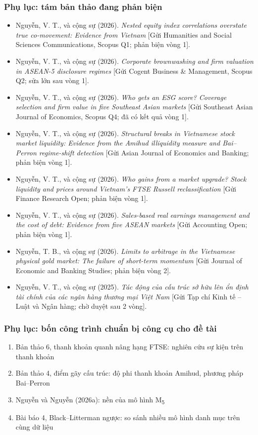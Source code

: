 \documentclass[11pt, xcolor={dvipsnames}, aspectratio=169, usepdftitle=false]{beamer}
\newcommand{\MM}[1]{M\textsubscript{#1}}
\begin{document}
\begin{frame}[allowframebreaks]
\frametitle{Phụ lục: tám bản thảo đang phản biện}
\hypertarget{banThao}{}%
\begin{itemize}
\item Nguyễn, V. T., và cộng sự (2026). \emph{Nested equity index correlations overstate true co-movement: Evidence from Vietnam} [Gửi Humanities and Social Sciences Communications, Scopus Q1; phản biện vòng 1].
\item Nguyễn, V. T., và cộng sự (2026). \emph{Corporate brownwashing and firm valuation in ASEAN-5 disclosure regimes} [Gửi Cogent Business \& Management, Scopus Q2; sửa lớn sau vòng 1].
\item Nguyễn, V. T., và cộng sự (2026). \emph{Who gets an ESG score? Coverage selection and firm value in five Southeast Asian markets} [Gửi Southeast Asian Journal of Economics, Scopus Q4; đã có kết quả vòng 1].
\item Nguyễn, V. T., và cộng sự (2026). \emph{Structural breaks in Vietnamese stock market liquidity: Evidence from the Amihud illiquidity measure and Bai--Perron regime-shift detection} [Gửi Asian Journal of Economics and Banking; phản biện vòng 1].
\item Nguyễn, V. T., và cộng sự (2026). \emph{Who gains from a market upgrade? Stock liquidity and prices around Vietnam's FTSE Russell reclassification} [Gửi Finance Research Open; phản biện vòng 1].
\item Nguyễn, V. T., và cộng sự (2026). \emph{Sales-based real earnings management and the cost of debt: Evidence from five ASEAN markets} [Gửi Accounting Open; phản biện vòng 1].
\item Nguyễn, T. B., và cộng sự (2026). \emph{Limits to arbitrage in the Vietnamese physical gold market: The failure of short-term momentum} [Gửi Journal of Economic and Banking Studies; phản biện vòng 2].
\item Nguyễn, V. T., và cộng sự (2025). \emph{Tác động của cấu trúc sở hữu lên ổn định tài chính của các ngân hàng thương mại Việt Nam} [Gửi Tạp chí Kinh tế -- Luật và Ngân hàng; chờ duyệt sau 2 vòng].
\end{itemize}
\end{frame}

\begin{frame}[label=dungCho]
\frametitle{Phụ lục: bốn công trình chuẩn bị công cụ cho đề tài}
\begin{enumerate}
\item Bản thảo 6, thanh khoản quanh nâng hạng FTSE: nghiên cứu sự kiện trên thanh khoản
\item Bản thảo 4, điểm gãy cấu trúc: độ phi thanh khoản Amihud, phương pháp Bai--Perron
\item Nguyễn và Nguyễn (2026a): nền của mô hình \MM{5}
\item Bài báo 4, Black--Litterman ngược: so sánh nhiều mô hình danh mục trên cùng dữ liệu
\end{enumerate}
\hyperlink{congTrinh}{}
\end{frame}
\end{document}
